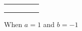 \documentclass[12pt]{article}
\begin{document}
\begin{table}[htb]
{\begin{tabular}{|l|l|l|l|l|}
                        &                        &                         &                         &                        \\ \hline
                        &                        &                         &                         &                        \\ \hline
                        &                        &                         &                         &                        \\ \hline
                        &                        &                         &                         &                        \\ \hline
                    \end{tabular}
}
\end{table}
\newpage
When $a = 1$ and $b = -1$
\end{document}
